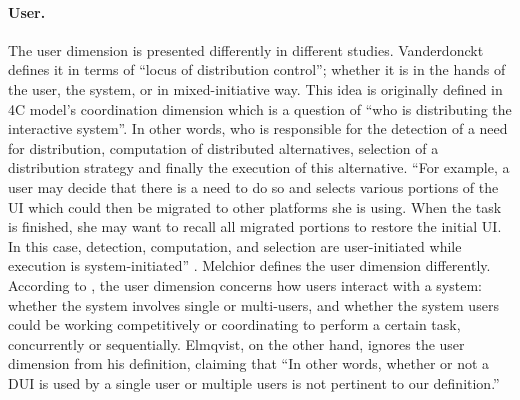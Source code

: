 \paragraph{User.} The user dimension is presented differently in different
studies. Vanderdonckt \cite{vanderdonckt2010distributed} defines it in terms of 
``locus of distribution control''; whether it is in the hands of the user, the
system, or in mixed-initiative way. This idea is originally defined in 4C
model's coordination dimension which is a question of ``who is distributing the interactive system''\cite{demeure20084c}.
In other words, who is responsible for the detection of a need for distribution,
computation of distributed alternatives, selection of a distribution strategy and
finally the execution of this alternative. ``For example, a user may decide
that there is a need to do so and selects various portions of the UI which could
then be migrated to other platforms she is using. When the task is finished, she
may want to recall all migrated portions to restore the initial UI. In this
case, detection, computation, and selection are user-initiated while execution
is system-initiated'' \cite{demeure20084c}. Melchior defines the user dimension
differently. According to \cite{melchior2011distributed}, the user dimension concerns how users interact
with a system: whether the system involves single or multi-users, and whether
the system users could be working competitively or coordinating to perform a
certain task, concurrently or sequentially. Elmqvist, on the other hand, ignores
the user dimension from his definition, claiming that ``In other words, whether or not a DUI is used by a single user or multiple users is not pertinent to our
definition.''\cite{elmqvist2011distributed}

